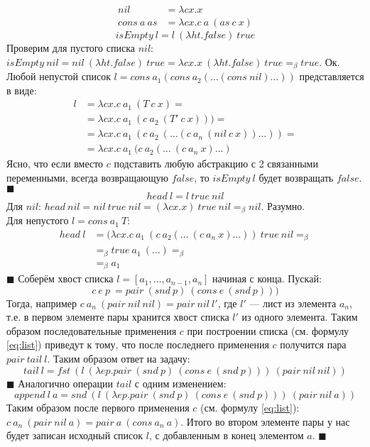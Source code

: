 \begin{align*}
	nil &= \lambda cx.x \\
	cons\ a\ as &= \lambda cx.c\ a\ (as\ c\ x)
\end{align*}
\[isEmpty\ l = l\ (\lambda ht.false)\ true\]
Проверим для пустого списка $nil$: $isEmpty\ nil = nil\ (\lambda ht.false)\ true = \lambda cx.x\ (\lambda ht.false)\ 
true =_\beta true$. Ок. Любой непустой список $l = cons\ a_1 (cons\ a_2 (\ldots(cons\ nil)\ldots))$ представляется в виде:
\begin{align}
l &= \lambda cx.c\ a_1\ (T\ c\ x)=\\
  &= \lambda cx.c\ a_1\ (c\ a_2\ (T'\ c\ x)))=\\
  &= \lambda cx.c\ a_1\ (c\ a_2\ (\ldots (c\ a_n\ (nil\ c\ x))\ldots))=\\
  &= \lambda cx.c\ a_1\ (c\ a_2(\ldots\ (c\ a_n\ x)\ldots) \label{eq:list}
\end{align}
Ясно, что если вместо $c$ подставить любую абстракцию с 2 связанными переменными, всегда возвращающую $false$, то $isEmpty\ l$ будет возвращать $false$. \hfill $\blacksquare$
\task{$head$}
\[ head\ l =  l\ true\ nil\]
Для $nil$: $head\ nil = nil\ true\ nil = (\lambda cx.x)\ true\ nil =_\beta nil$. Разумно.\\
Для непустого $l = cons\ a_1\ T$: 
\begin{align*}
head\ l &= (\lambda cx.c\ a_1\ (c\ a_2(\ldots\ (c\ a_n\ x)\ldots))\ true\ nil =_\beta \\
	    &=_\beta true\ a_1\ (\ldots) =_\beta \\
	    &=_\beta a_1
\end{align*}
\hfill $\blacksquare$
Соберём хвост списка $l = [a_1,\ldots,a_{n-1},a_n]$ начиная с конца. Пускай:
\[c\ e\ p\ = pair\ (snd\ p)\ (cons\ e\ (snd\ p)))\]
Тогда, например $c\ a_n\ (pair\ nil\ nil) = pair\ nil\ l'$, где $l'$ --- лист из элемента $a_n$, т.е. в первом элементе пары хранится хвост списка $l'$ из одного элемента. Таким образом последовательные применения $c$ при построении списка (см. формулу \ref{eq:list}) приведут к тому, что после последнего применения $c$ получится пара $pair\ tail\ l$. Таким образом ответ на задачу:
\[tail\ l = fst\ (l\ (\lambda ep.pair\ (snd\ p)\ (cons\ e\ (snd\ p)))\ (pair\ nil\ nil))\]
\hfill $\blacksquare$
Аналогично операции $tail$ с одним изменением:
\[append\ l\ a = snd\ (l\ (\lambda ep.pair\ (snd\ p)\ (cons\ e\ (snd\ p)))\ (pair\ nil\ a))\]
Таким образом после первого применения $c$ (см. формулу \ref{eq:list}): $c\ a_n\ (pair\ nil\ a) = pair\ a\ (cons\ a_n\ a)$. Итого во втором элементе пары у нас будет записан исходный список $l$, с добавленным в конец элементом $a$. \hfill $\blacksquare$
\tasksection{$Y$-комбинатор}
\task{}
\task{}
\task{}

